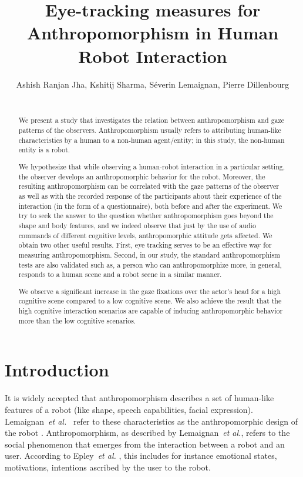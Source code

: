 \documentclass{acm_proc_article-sp}
\title{Eye-tracking measures for Anthropomorphism in Human Robot Interaction}
\author{
\alignauthor Ashish Ranjan Jha, Kshitij Sharma, Séverin Lemaignan, Pierre Dillenbourg\\
    \affaddr{CHILI Lab, École Polytechnique Fédérale de Lausanne}\\
       \email{firstname.lastname@epfl.ch}
}
\newcommand{\etal}{{\textit{et al.\xspace}}}
\begin{document}
\maketitle
\begin{abstract}


We present a study that investigates the relation between anthropomorphism and
gaze patterns of the observers. Anthropomorphism usually refers to attributing
human-like characteristics by a human to a non-human agent/entity; in this
study, the non-human entity is a robot. 

We hypothesize that while observing a human-robot interaction in a particular
setting, the observer develops an anthropomorphic behavior for the robot.
Moreover, the resulting anthropomorphism can be correlated with the gaze
patterns of the observer as well as with the recorded response of the
participants about their experience of the interaction (in the form of a
questionnaire), both before and after the experiment. We try to seek the answer
to the question whether anthropomorphism goes beyond the shape and body
features, and we indeed observe that just by the use of audio commands of
different cognitive levels, anthropomorphic attitude gets affected. We obtain
two other useful results. First, eye tracking serves to be an effective way for
measuring anthropomorphism. Second, in our study, the standard anthropomorphism
tests are also validated such as, a person who can anthropomorphize more, in
general, responds to a human scene and a robot scene in a similar manner.

We observe a significant increase in the gaze fixations over the actor's head
for a high cognitive scene compared to a low cognitive scene. We also achieve
the result that the high cognitive interaction scenarios are capable of inducing
anthropomorphic behavior more than the low cognitive scenarios.

\end{abstract}


\section{Introduction}

It is widely accepted that anthropomorphism describes a set of human-like
features of a robot (like shape, speech capabilities, facial expression).
Lemaignan~\etal~\cite{lemaignan2014dynamics}  refer to these characteristics as the
anthropomorphic design of the robot .  Anthropomorphism, as described by
Lemaignan~\etal, refers to the social phenomenon that emerges from the
interaction between a robot and an user. According to Epley~\etal
\cite{epley_when_2008},
this includes for instance emotional states, motivations, intentions ascribed by
the user to the robot. 
\end{document}
